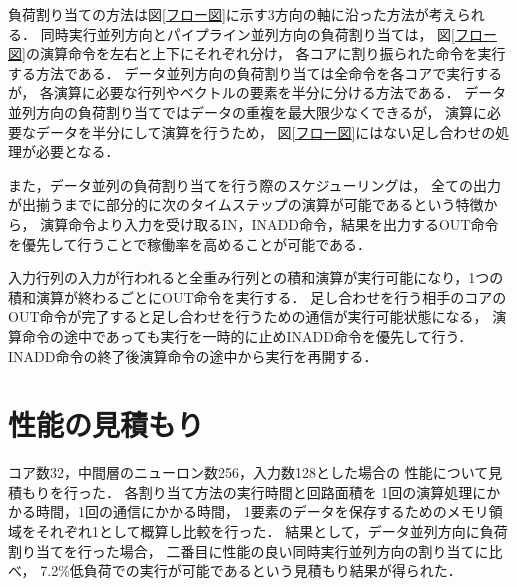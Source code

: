 \documentclass[a4j]{jarticle}
\begin{document}
\begin{Abstract}
負荷割り当ての方法は図\ref{フロー図}に示す3方向の軸に沿った方法が考えられる．
同時実行並列方向とパイプライン並列方向の負荷割り当ては，
図\ref{フロー図}の演算命令を左右と上下にそれぞれ分け，
各コアに割り振られた命令を実行する方法である．
データ並列方向の負荷割り当ては全命令を各コアで実行するが，
各演算に必要な行列やベクトルの要素を半分に分ける方法である．
データ並列方向の負荷割り当てではデータの重複を最大限少なくできるが，
演算に必要なデータを半分にして演算を行うため，
図\ref{フロー図}にはない足し合わせの処理が必要となる．

また，データ並列の負荷割り当てを行う際のスケジューリングは，
全ての出力が出揃うまでに部分的に次のタイムステップの演算が可能であるという特徴から，
演算命令より入力を受け取るIN，INADD命令，結果を出力するOUT命令を優先して行うことで稼働率を高めることが可能である．

入力行列の入力が行われると全重み行列との積和演算が実行可能になり，1つの積和演算が終わるごとにOUT命令を実行する．
足し合わせを行う相手のコアのOUT命令が完了すると足し合わせを行うための通信が実行可能状態になる，
演算命令の途中であっても実行を一時的に止めINADD命令を優先して行う．
INADD命令の終了後演算命令の途中から実行を再開する．

 \section{性能の見積もり}
 コア数32，中間層のニューロン数256，入力数128とした場合の
 性能について見積もりを行った．
 各割り当て方法の実行時間と回路面積を
 1回の演算処理にかかる時間，1回の通信にかかる時間，
 1要素のデータを保存するためのメモリ領域をそれぞれ1として概算し比較を行った．
 結果として，データ並列方向に負荷割り当てを行った場合，
 二番目に性能の良い同時実行並列方向の割り当てに比べ，
 7.2\%低負荷での実行が可能であるという見積もり結果が得られた．


\end{Abstract}
\end{document}
